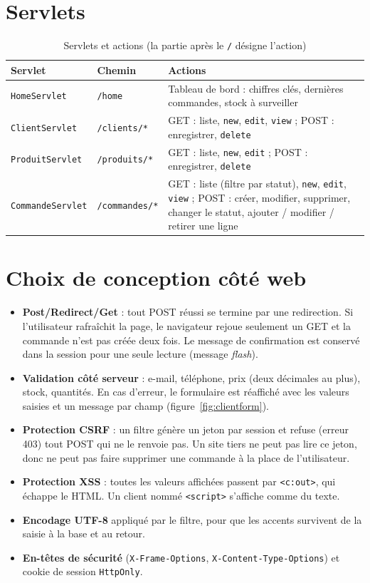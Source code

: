 \documentclass[11pt,a4paper]{report}
\begin{document}
\section{Servlets}
\begin{table}[H]
\centering
\caption{Servlets et actions (la partie apr\`es le \texttt{/} d\'esigne l'action)}\label{tab:servlets}
\begin{tabularx}{\textwidth}{@{}llX@{}}
\toprule
\textbf{Servlet} & \textbf{Chemin} & \textbf{Actions}\\
\midrule
\texttt{HomeServlet} & \texttt{/home} & Tableau de bord : chiffres cl\'es, derni\`eres commandes, stock \`a surveiller\\
\texttt{ClientServlet} & \texttt{/clients/*} & GET : liste, \texttt{new}, \texttt{edit}, \texttt{view} ; POST : enregistrer, \texttt{delete}\\
\texttt{ProduitServlet} & \texttt{/produits/*} & GET : liste, \texttt{new}, \texttt{edit} ; POST : enregistrer, \texttt{delete}\\
\texttt{CommandeServlet} & \texttt{/commandes/*} & GET : liste (filtre par statut), \texttt{new}, \texttt{edit}, \texttt{view} ; POST : cr\'eer, modifier, supprimer, changer le statut, ajouter / modifier / retirer une ligne\\
\bottomrule
\end{tabularx}
\end{table}

\section{Choix de conception c\^ot\'e web}
\begin{itemize}
  \item \textbf{Post/Redirect/Get} : tout POST r\'eussi se termine par une redirection. Si l'utilisateur rafra\^ichit la page, le navigateur rejoue seulement un GET et la commande n'est pas cr\'e\'ee deux fois. Le message de confirmation est conserv\'e dans la session pour une seule lecture (message \emph{flash}).
  \item \textbf{Validation c\^ot\'e serveur} : e-mail, t\'el\'ephone, prix (deux d\'ecimales au plus), stock, quantit\'es. En cas d'erreur, le formulaire est r\'eaffich\'e avec les valeurs saisies et un message par champ (figure~\ref{fig:clientform}).
  \item \textbf{Protection CSRF} : un filtre g\'en\`ere un jeton par session et refuse (erreur 403) tout POST qui ne le renvoie pas. Un site tiers ne peut pas lire ce jeton, donc ne peut pas faire supprimer une commande \`a la place de l'utilisateur.
  \item \textbf{Protection XSS} : toutes les valeurs affich\'ees passent par \texttt{<c:out>}, qui \'echappe le HTML. Un client nomm\'e \texttt{<script>} s'affiche comme du texte.
  \item \textbf{Encodage UTF-8} appliqu\'e par le filtre, pour que les accents survivent de la saisie \`a la base et au retour.
  \item \textbf{En-t\^etes de s\'ecurit\'e} (\texttt{X-Frame-Options}, \texttt{X-Content-Type-Options}) et cookie de session \texttt{HttpOnly}.
\end{itemize}
\end{document}
